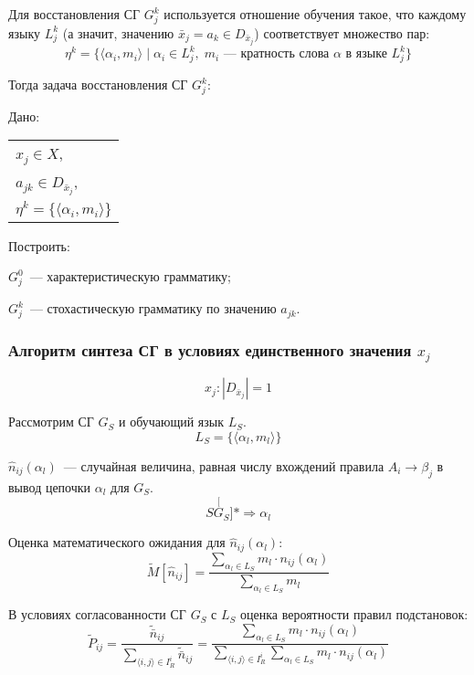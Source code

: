 Для восстановления СГ $G_j^k$ используется отношение обучения такое,
что каждому языку $L_j^k$ (а значит, значению $\bar{x}_j = a_k \in
D_{\bar{x}_j}$) соответствует множество пар:
$$
\eta^k = \{\langle \alpha_i,m_i \rangle \mid \alpha_i \in L_j^k, \;
m_i\text{~--- кратность слова $\alpha$ в языке $L_j^k$}\}
$$

Тогда задача восстановления СГ $G_j^k$:

Дано:
\begin{tabular}[t]{l}
  $x_j \in X$,\\
  $a_{jk} \in D_{\bar{x}_j}$,\\
  $\eta^k = \{\langle \alpha_i,m_i \rangle\}$
\end{tabular}

Построить:
\begin{list}{)}{}
\item $G_j^0$~--- характеристическую грамматику;
\item $G_j^k$~--- стохастическую грамматику по значению $a_{jk}$.
\end{list}


\subsubsection{Алгоритм синтеза СГ в условиях единственного
  значения $x_j$}

$$x_j: |D_{\bar{x}_j}| = 1$$

Рассмотрим СГ $G_S$ и обучающий язык $L_S$.
$$ L_S = \{\langle \alpha_l,m_l \rangle \}$$

$\hat{n}_{ij}(\alpha_l)$~--- случайная величина, равная числу
вхождений правила $A_i \to \beta_j$ в вывод цепочки $\alpha_l$ для
$G_S$.
$$ S \stackrel[G_S]{*}{\Rightarrow} \alpha_l$$

Оценка математического ожидания для $\hat{n}_{ij}(\alpha_l)$:
\begin{equation}
\tilde{M}[\hat{n}_{ij}] = \frac{\sum\limits_{\alpha_l \in L_S}m_l \cdot
  n_{ij}(\alpha_l)}{\sum\limits_{\alpha_l \in L_S}m_l}
\label{eq:M}
\end{equation}

В условиях согласованности СГ $G_S$ с $L_S$ оценка вероятности правил
подстановок:
\begin{equation}
  \tilde{P}_{ij} = \frac{\tilde{\bar{n}}_{ij}}{\sum\limits_{\langle i,j
      \rangle \in I_R^i}\tilde{\bar{n}}_{ij}} =
  \frac{\sum\limits_{\alpha_l \in L_S}m_l \cdot
    n_{ij}(\alpha_l)}{\sum\limits_{\langle i,j \rangle \in
      I_R^i}\sum\limits_{\alpha_l \in L_S}m_l \cdot n_{ij}(\alpha_l)}
\label{eq:Pij}
\end{equation}

